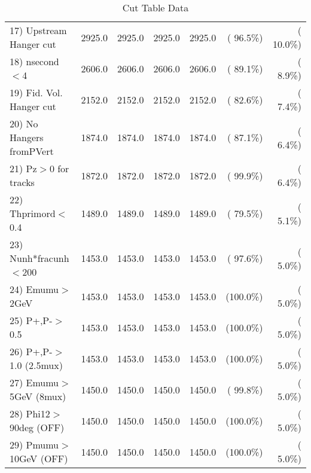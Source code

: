 \begin{table}[h!]
\begin{tabular}{||l||r|r|r|r|r|r||}
 17) Upstream Hanger cut  &       2925.0 &       2925.0 &       2925.0 &       2925.0 & ( 96.5\%) & ( 10.0\%) \\
 18) nsecond$<$4          &       2606.0 &       2606.0 &       2606.0 &       2606.0 & ( 89.1\%) & (  8.9\%) \\
 19) Fid. Vol. Hanger cut &       2152.0 &       2152.0 &       2152.0 &       2152.0 & ( 82.6\%) & (  7.4\%) \\
 20) No Hangers fromPVert &       1874.0 &       1874.0 &       1874.0 &       1874.0 & ( 87.1\%) & (  6.4\%) \\
 21) Pz$>$0 for tracks    &       1872.0 &       1872.0 &       1872.0 &       1872.0 & ( 99.9\%) & (  6.4\%) \\
 22) Thprimord$<$0.4      &       1489.0 &       1489.0 &       1489.0 &       1489.0 & ( 79.5\%) & (  5.1\%) \\
 23) Nunh*fracunh$<$200   &       1453.0 &       1453.0 &       1453.0 &       1453.0 & ( 97.6\%) & (  5.0\%) \\
 24) Emumu$>$2GeV         &       1453.0 &       1453.0 &       1453.0 &       1453.0 & (100.0\%) & (  5.0\%) \\
 25) P+,P-$>$0.5          &       1453.0 &       1453.0 &       1453.0 &       1453.0 & (100.0\%) & (  5.0\%) \\
 26) P+,P-$>$1.0 (2.5mux) &       1453.0 &       1453.0 &       1453.0 &       1453.0 & (100.0\%) & (  5.0\%) \\
 27) Emumu$>$5GeV  (8mux) &       1450.0 &       1450.0 &       1450.0 &       1450.0 & ( 99.8\%) & (  5.0\%) \\
 28) Phi12$>$90deg  (OFF) &       1450.0 &       1450.0 &       1450.0 &       1450.0 & (100.0\%) & (  5.0\%) \\
 29) Pmumu$>$10GeV  (OFF) &       1450.0 &       1450.0 &       1450.0 &       1450.0 & (100.0\%) & (  5.0\%) \\
 \hline
 \hline
 \end{tabular}
 \caption{Cut Table  Data     }
 \label{tab-cutcohjpsi-mumu_data}
 \end{table}
